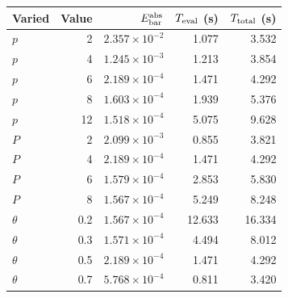 \begin{tabular}{@{}lrrrr@{}}
\toprule
Varied & Value & $E_{\rm bar}^{\rm abs}$ & $T_{\rm eval}$ (s) & $T_{\rm total}$ (s)\\
\midrule
$p$ & 2 & $2.357\times10^{-2}$ & 1.077 & 3.532\\
$p$ & 4 & $1.245\times10^{-3}$ & 1.213 & 3.854\\
$p$ & 6 & $2.189\times10^{-4}$ & 1.471 & 4.292\\
$p$ & 8 & $1.603\times10^{-4}$ & 1.939 & 5.376\\
$p$ & 12 & $1.518\times10^{-4}$ & 5.075 & 9.628\\
$P$ & 2 & $2.099\times10^{-3}$ & 0.855 & 3.821\\
$P$ & 4 & $2.189\times10^{-4}$ & 1.471 & 4.292\\
$P$ & 6 & $1.579\times10^{-4}$ & 2.853 & 5.830\\
$P$ & 8 & $1.567\times10^{-4}$ & 5.249 & 8.248\\
$\theta$ & 0.2 & $1.567\times10^{-4}$ & 12.633 & 16.334\\
$\theta$ & 0.3 & $1.571\times10^{-4}$ & 4.494 & 8.012\\
$\theta$ & 0.5 & $2.189\times10^{-4}$ & 1.471 & 4.292\\
$\theta$ & 0.7 & $5.768\times10^{-4}$ & 0.811 & 3.420\\
\bottomrule
\end{tabular}

